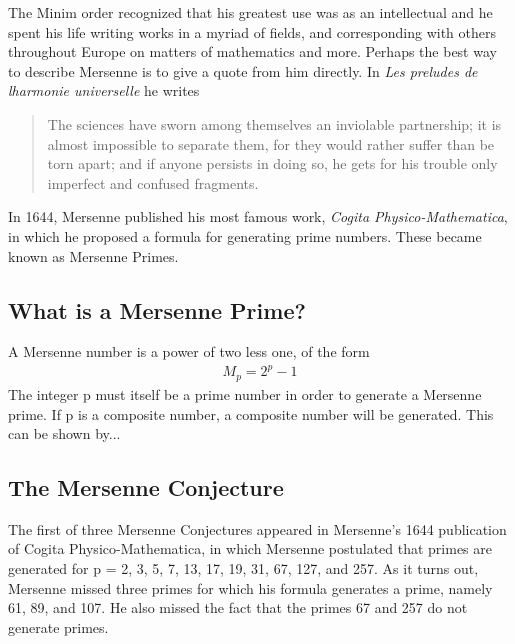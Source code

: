 The Minim order recognized that his greatest use was as an intellectual and he spent his life writing works in a myriad of fields, and corresponding with others throughout Europe on matters of mathematics and more. Perhaps the best way to describe Mersenne is to give a quote from him directly. In \emph{Les preludes de lharmonie universelle} he writes \cite{lfrench}

\begin{quote}
The sciences have sworn among themselves an inviolable partnership; it is almost impossible to separate them, for they would rather suffer than be torn apart; and if anyone persists in doing so, he gets for his trouble only imperfect and confused fragments. 
\end{quote}

In 1644, Mersenne published his most famous work, \emph{Cogita Physico-Mathematica}, in which he proposed a formula for generating prime numbers. These became known as Mersenne Primes.

\subsection{What is a Mersenne Prime?}

A Mersenne number is a power of two less one, of the form
\begin{align}
M_p = 2^p - 1
\end{align}
The integer p must itself be a prime number in order to generate a Mersenne prime. If p is a
composite number, a composite number will be generated. This can be shown by...

\subsection{The Mersenne Conjecture}

The first of three Mersenne Conjectures appeared in Mersenne’s 1644 publication of Cogita
Physico-Mathematica, in which Mersenne postulated that primes are generated for p = 2, 3, 5,
7, 13, 17, 19, 31, 67, 127, and 257. As it turns out, Mersenne missed three primes for which his
formula generates a prime, namely 61, 89, and 107. He also missed the fact that the primes 67
and 257 do not generate primes.

